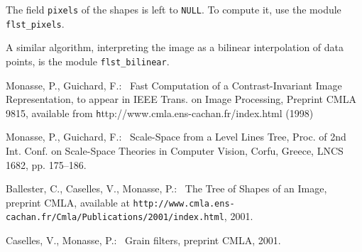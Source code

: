 The field \texttt{pixels} of the shapes is left to \texttt{NULL}. To compute
it, use the module \texttt{flst\_pixels}.

A similar algorithm, interpreting the image as a bilinear interpolation of
data points, is the module \texttt{flst\_bilinear}.

\begin{thebibliography}{10}
 Monasse, P., Guichard, F.:~
Fast Computation of a Contrast-Invariant Image Representation,
to appear in IEEE Trans. on Image Processing,
Preprint CMLA 9815, available from {\texttt
http://www.cmla.ens-cachan.fr/index.html} (1998)

 Monasse, P., Guichard, F.:~
Scale-Space from a Level Lines Tree,
Proc. of 2nd Int. Conf. on Scale-Space Theories in Computer
Vision, Corfu, Greece, LNCS 1682, pp. 175--186.

 Ballester, C., Caselles, V., Monasse, P.:~
The Tree of Shapes of an Image,
preprint CMLA, available at
\texttt{http://www.cmla.ens-cachan.fr/Cmla/Publications/2001/index.html},
2001.

 Caselles, V., Monasse, P.:~
Grain filters,
preprint CMLA, 2001.
\end{thebibliography}
